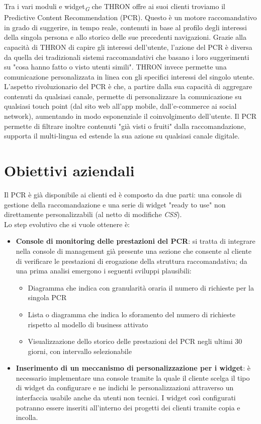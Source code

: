 \documentclass[a4paper, 12pt, twoside, openright]{book}
\newcommand{\gloss}[1]{#1\textsubscript{\textit{\tiny{G}}}}
\begin{document}
Tra i vari moduli e \gloss{widget} che THRON offre ai suoi clienti troviamo il Predictive Content Recommendation (PCR). Questo è un motore raccomandativo in grado di suggerire, in tempo reale, contenuti in base al profilo degli interessi della singola persona e allo storico delle sue precedenti navigazioni. Grazie alla capacità di THRON di capire gli interessi dell'utente, l'azione del PCR è diversa da quella dei tradizionali sistemi raccomandativi che basano i loro suggerimenti su "cosa hanno fatto o visto utenti simili". THRON invece permette una comunicazione personalizzata in linea con gli specifici interessi del singolo utente. L'aspetto rivoluzionario del PCR è che, a partire dalla sua capacità di aggregare contenuti da qualsiasi canale, permette di personalizzare la comunicazione su qualsiasi touch point (dal sito web all'app mobile, dall'e-commerce ai social network), aumentando in modo esponenziale il coinvolgimento dell'utente. Il PCR permette di filtrare inoltre contenuti "già visti o fruiti" dalla raccomandazione, supporta il multi-lingua ed estende la sua azione su qualsiasi canale digitale.

\newpage{}
\section{Obiettivi aziendali}
Il PCR è già disponibile ai clienti ed è composto da due parti: una console di gestione della raccomandazione e una serie di widget "ready to use" non direttamente personalizzabili (al netto di modifiche \textit{CSS}).\\
Lo step evolutivo che si vuole ottenere è:
\begin{itemize}
\item \textbf{Console di monitoring delle prestazioni del PCR}: si tratta di integrare nella console di management già presente una sezione che consente al cliente di verificare le prestazioni di erogazione della struttura raccomandativa; da una prima analisi emergono i seguenti sviluppi plausibili:
	\begin{itemize}
	\item Diagramma che indica con granularità oraria il numero di richieste per la singola PCR
	\item Lista o diagramma che indica lo sforamento del numero di richieste rispetto al modello di business attivato
	\item Visualizzazione dello storico delle prestazioni del PCR negli ultimi 30 giorni, con intervallo selezionabile
	\end{itemize}
\item \textbf{Inserimento di un meccanismo di personalizzazione per i widget}: è necessario implementare una console tramite la quale il cliente scelga il tipo di widget da configurare e ne indichi le personalizzazioni attraverso un interfaccia usabile anche da utenti non tecnici. I widget così configurati potranno essere inseriti all'interno dei progetti dei clienti tramite copia e incolla.
\end{itemize}
\end{document}
